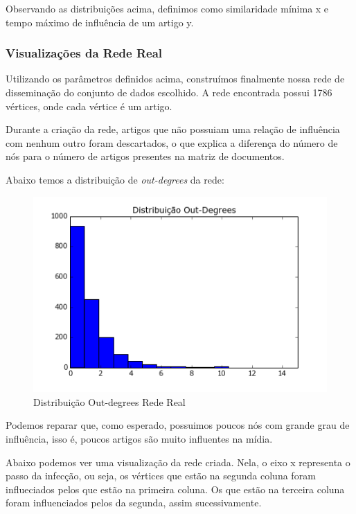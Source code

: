 \documentclass[a4paper,12pt]{article}
\begin{document}
Observando as distribuições acima, definimos como similaridade mínima x e tempo máximo de influência de um artigo y.

\pagebreak
\subsubsection{Visualizações da Rede Real}

Utilizando os parâmetros definidos acima, construímos finalmente nossa rede de disseminação do conjunto de dados escolhido.
A rede encontrada possui 1786 vértices, onde cada vértice é um artigo.

Durante a criação da rede, artigos que não possuiam uma relação de influência com nenhum outro foram descartados, o que explica a diferença
do número de nós para o número de artigos presentes na matriz de documentos.

Abaixo temos a distribuição de \textit{out-degrees} da rede:

\begin{figure}[ht]
 \centering
 \includegraphics[scale=0.7]{../Notebook/dist_outs.png}
 \caption{Distribuição Out-degrees Rede Real}
\end{figure}

Podemos reparar que, como esperado, possuimos poucos nós com grande grau de influência, isso é, poucos artigos são muito influentes na
mídia. 

Abaixo podemos ver uma visualização da rede criada. Nela, o eixo x representa o passo da infecção, ou seja, os vértices que estão na 
segunda coluna foram influeciados pelos que estão na primeira coluna. Os que estão na terceira coluna foram influenciados pelos da segunda, 
assim sucessivamente. 
\end{document}
